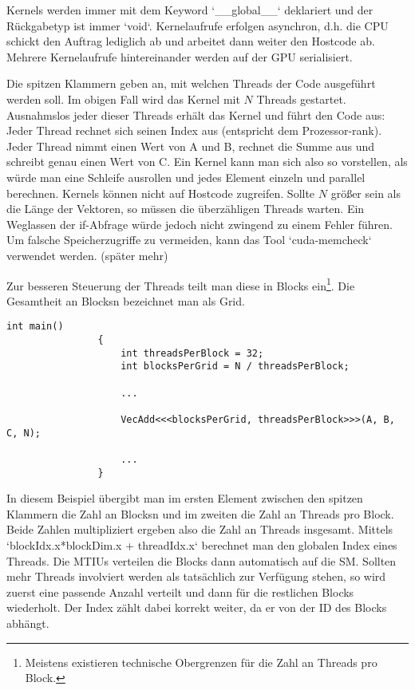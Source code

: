 			\Glspl{Kernel} werden immer mit dem Keyword \li`__global__` deklariert und der Rückgabetyp ist immer \li`void`. \Gls{Kernel}aufrufe erfolgen asynchron, d.h. die CPU schickt den Auftrag lediglich ab und arbeitet dann weiter den Hostcode ab. Mehrere \Gls{Kernel}aufrufe hintereinander werden auf der GPU serialisiert.
			
			Die spitzen Klammern geben an, mit welchen \Glspl{Thread} der Code ausgeführt werden soll. Im obigen Fall wird das \Gls{Kernel} mit $N$ \Glspl{Thread} gestartet. Ausnahmslos jeder dieser \Glspl{Thread} erhält das \Gls{Kernel} und führt den Code aus: Jeder \Gls{Thread} rechnet sich seinen Index aus (entspricht dem Prozessor-rank). Jeder \Gls{Thread} nimmt einen Wert von A und B, rechnet die Summe aus und schreibt genau einen Wert von C. Ein \Gls{Kernel} kann man sich also so vorstellen, als würde man eine Schleife ausrollen und jedes Element einzeln und parallel berechnen. \Glspl{Kernel} können nicht auf Hostcode zugreifen. Sollte $N$ größer sein als die Länge der Vektoren, so müssen die überzähligen \Glspl{Thread} warten. Ein Weglassen der if-Abfrage würde jedoch nicht zwingend zu einem Fehler führen. Um falsche Speicherzugriffe zu vermeiden, kann das Tool \li`cuda-memcheck` verwendet werden. (später mehr)
			
			Zur besseren Steuerung der \Glspl{Thread} teilt man diese in \Glspl{Block} ein\footnote{Meistens existieren technische Obergrenzen für die Zahl an Threads pro Block.}. Die Gesamtheit an \Glspl{Block}n bezeichnet man als \Gls{Grid}.
			
			\begin{lstlisting}[caption=Kernelaufruf]		
				int main()
				{
					int threadsPerBlock = 32;
					int blocksPerGrid = N / threadsPerBlock;
					
					...
					
					VecAdd<<<blocksPerGrid, threadsPerBlock>>>(A, B, C, N);
					
					...					
				}
			\end{lstlisting}

			In diesem Beispiel übergibt man im ersten Element zwischen den spitzen Klammern die Zahl an \Glspl{Block}n und im zweiten die Zahl an \Glspl{Thread} pro \Gls{Block}. Beide Zahlen multipliziert ergeben also die Zahl an \Glspl{Thread} insgesamt. Mittels \li`blockIdx.x*blockDim.x + threadIdx.x` berechnet man den globalen Index eines \Glspl{Thread}. Die \Glspl{MTIU} verteilen die \Glspl{Block} dann automatisch auf die \Gls{SM}. Sollten mehr \Glspl{Thread} involviert werden als tatsächlich zur Verfügung stehen, so wird zuerst eine passende Anzahl verteilt und dann für die restlichen \Glspl{Block} wiederholt. Der Index zählt dabei korrekt weiter, da er von der ID des \Gls{Block}s abhängt.
			
